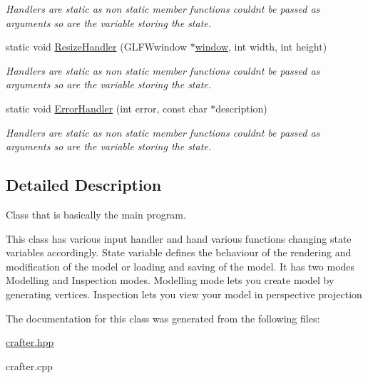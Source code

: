 \begin{DoxyCompactItemize}
\begin{DoxyCompactList}\small\item\em Handlers are static as non static member functions couldn\textquotesingle{}t be passed as arguments so are the variable storing the state. \end{DoxyCompactList}\item 
static void \hyperlink{classcft_1_1Crafter_ac3a3d9f8dca115508e85f38c9e66eee5}{Resize\+Handler} (G\+L\+F\+Wwindow $\ast$\hyperlink{classcft_1_1Crafter_a70b8292b32d9eda7b3ce9e8c86161042}{window}, int width, int height)\hypertarget{classcft_1_1Crafter_ac3a3d9f8dca115508e85f38c9e66eee5}{}\label{classcft_1_1Crafter_ac3a3d9f8dca115508e85f38c9e66eee5}

\begin{DoxyCompactList}\small\item\em Handlers are static as non static member functions couldn\textquotesingle{}t be passed as arguments so are the variable storing the state. \end{DoxyCompactList}\item 
static void \hyperlink{classcft_1_1Crafter_ad145c5077488de420916468c97a638e8}{Error\+Handler} (int error, const char $\ast$description)\hypertarget{classcft_1_1Crafter_ad145c5077488de420916468c97a638e8}{}\label{classcft_1_1Crafter_ad145c5077488de420916468c97a638e8}

\begin{DoxyCompactList}\small\item\em Handlers are static as non static member functions couldn\textquotesingle{}t be passed as arguments so are the variable storing the state. \end{DoxyCompactList}\end{DoxyCompactItemize}


\subsection{Detailed Description}
Class that is basically the main program. 

This class has various input handler and hand various functions changing state variables accordingly. State variable defines the behaviour of the rendering and modification of the model or loading and saving of the model. It has two modes Modelling and Inspection modes. Modelling mode lets you create model by generating vertices. Inspection lets you view your model in perspective projection 

The documentation for this class was generated from the following files\+:\begin{DoxyCompactItemize}
\item 
\hyperlink{crafter_8hpp}{crafter.\+hpp}\item 
crafter.\+cpp\end{DoxyCompactItemize}
